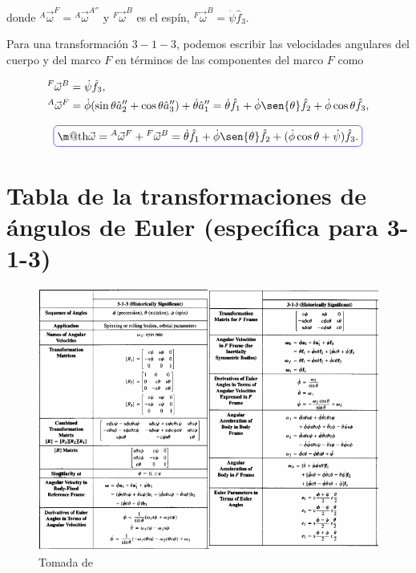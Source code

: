\documentclass[a4paper,10pt]{article}
\makeatletter
\numberwithin{equation}{section}
\newcommand*{\boxcolor}{blue}
\renewcommand{\boxed}[1]{\textcolor{\boxcolor}{%
\tikz[baseline={([yshift=-1ex]current bounding box.center)}] \node [rectangle, minimum width=1ex,rounded corners,draw] {\normalcolor\m@th$\displaystyle#1$};}}
\makeatother
\begin{document}
donde ${^A}{ \vec{\omega}}^{F} = {^A}{ \vec{\omega}}^{A''}$ y ${^F}{ \vec{\omega}}^{B}$ 
es el espín, ${^F}{ \vec{\omega}}^{B} = \dot{\psi}\hat{f}_3$. 

\vspace{.cm}

Para una transformación $3-1-3$, podemos escribir las velocidades angulares del cuerpo 
y del marco $F$ en términos de las componentes del marco $F$ como

\begin{align}
\begin{split}
 {^F}{ \vec{\omega}}^{B} &= \dot{\psi}\hat{f}_3, \\
 {^A}{ \vec{\omega}}^{F} &= \dot{\phi}(\sin{\theta}\hat{a}''_2 + \cos{\theta}\hat{a}''_3) 
 + \dot{\theta}\hat{a}''_1 = \dot{\theta}\hat{f}_1 + \dot{\phi}\sen{\theta}\hat{f}_2 +
 \dot{\phi}\cos{\theta}\hat{f}_3,
\end{split}
\end{align}

\begin{equation}
 \boxed{\vec{\omega} = {^A}{ \vec{\omega}}^{F} + {^F}{ \vec{\omega}}^{B} = \dot{\theta}\hat{f}_1 
 + \dot{\phi}\sen{\theta}\hat{f}_2 + (\dot{\phi}\cos{\theta} + \dot{\psi})\hat{f}_3.}
\label{eq:velAngFframe3}
\end{equation}

\newpage

\section{Tabla de la transformaciones de ángulos de Euler (específica para 3-1-3)}

\begin{figure}[H]
 \center
 \includegraphics[scale=0.55]{apendice4fig1}
 \caption{Tomada de \cite{baruh}}
 \label{fig:apendice4fig1}
\end{figure}
\end{document}
